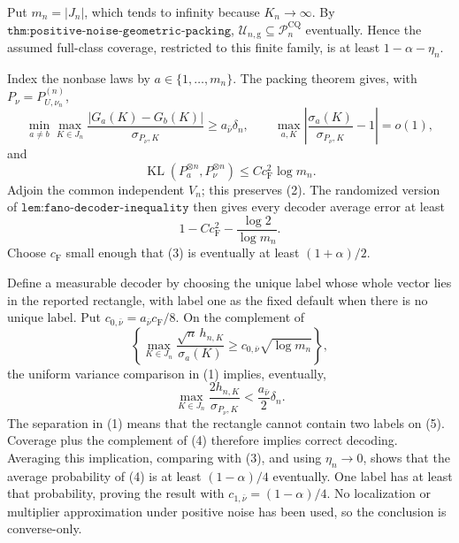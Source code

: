 Put \(m_n=|J_n|\), which tends to infinity because \(K_n\to\infty\).  By \(\texttt{thm:positive-noise-geometric-packing}\), \(\mathcal U_{n,\mathrm g}\subseteq\mathcal P_n^{\mathrm{CQ}}\) eventually.  Hence the assumed full-class coverage, restricted to this finite family, is at least \(1-\alpha-\eta_n\).

Index the nonbase laws by \(a\in\{1,\ldots,m_n\}\).  The packing theorem gives, with \(P_\nu=P_{U,\nu_n}^{(n)}\),
\[
 \min_{a\ne b}\max_{K\in J_n}
 \frac{|G_a(K)-G_b(K)|}{\sigma_{P_\nu,K}}
 \geq a_{\bar\nu}\delta_n,\qquad
 \max_{a,K}\left|\frac{\sigma_a(K)}{\sigma_{P_\nu,K}}-1\right|=o(1),                  \tag{1}
\]
and
\[
 \operatorname{KL}(P_a^{\otimes n},P_\nu^{\otimes n})
 \leq Cc_{\mathrm F}^2\log m_n.                                                         \tag{2}
\]
Adjoin the common independent \(V_n\); this preserves (2).  The randomized version of \(\texttt{lem:fano-decoder-inequality}\) then gives every decoder average error at least
\[
 1-Cc_{\mathrm F}^2-\frac{\log2}{\log m_n}.                                             \tag{3}
\]
Choose \(c_{\mathrm F}\) small enough that (3) is eventually at least \((1+\alpha)/2\).

Define a measurable decoder by choosing the unique label whose whole vector lies in the reported rectangle, with label one as the fixed default when there is no unique label.  Put \(c_{0,\bar\nu}=a_{\bar\nu}c_{\mathrm F}/8\).  On the complement of
\[
 \left\{\max_{K\in J_n}\frac{\sqrt n\,h_{n,K}}{\sigma_a(K)}
 \geq c_{0,\bar\nu}\sqrt{\log m_n}\right\},                                          \tag{4}
\]
the uniform variance comparison in (1) implies, eventually,
\[
 \max_{K\in J_n}\frac{2h_{n,K}}{\sigma_{P_\nu,K}}
 <\frac{a_{\bar\nu}}2\delta_n.                                                         \tag{5}
\]
The separation in (1) means that the rectangle cannot contain two labels on (5).  Coverage plus the complement of (4) therefore implies correct decoding.  Averaging this implication, comparing with (3), and using \(\eta_n\to0\), shows that the average probability of (4) is at least \((1-\alpha)/4\) eventually.  One label has at least that probability, proving the result with \(c_{1,\bar\nu}=(1-\alpha)/4\).  No localization or multiplier approximation under positive noise has been used, so the conclusion is converse-only.